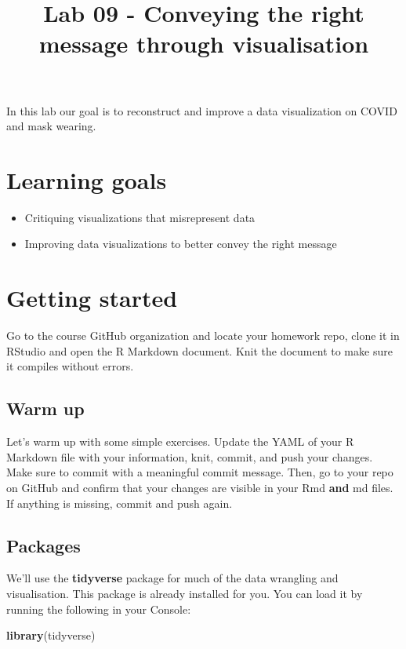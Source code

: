 \documentclass[
]{article}
\title{Lab 09 - Conveying the right message through visualisation}
\author{}
\date{\vspace{-2.5em}}
\newenvironment{Shaded}{\begin{snugshade}}{\end{snugshade}}
\newcommand{\FunctionTok}[1]{\textcolor[rgb]{0.13,0.29,0.53}{\textbf{#1}}}
\newcommand{\NormalTok}[1]{#1}
\providecommand{\tightlist}{%
  \setlength{\itemsep}{0pt}\setlength{\parskip}{0pt}}
\begin{document}
\maketitle

{
\setcounter{tocdepth}{2}
\tableofcontents
}
In this lab our goal is to reconstruct and improve a data visualization
on COVID and mask wearing.

\section{Learning goals}\label{learning-goals}

\begin{itemize}
\tightlist
\item
  Critiquing visualizations that misrepresent data
\item
  Improving data visualizations to better convey the right message
\end{itemize}

\section{Getting started}\label{getting-started}

Go to the course GitHub organization and locate your homework repo,
clone it in RStudio and open the R Markdown document. Knit the document
to make sure it compiles without errors.

\subsection{Warm up}\label{warm-up}

Let's warm up with some simple exercises. Update the YAML of your R
Markdown file with your information, knit, commit, and push your
changes. Make sure to commit with a meaningful commit message. Then, go
to your repo on GitHub and confirm that your changes are visible in your
Rmd \textbf{and} md files. If anything is missing, commit and push
again.

\subsection{Packages}\label{packages}

We'll use the \textbf{tidyverse} package for much of the data wrangling
and visualisation. This package is already installed for you. You can
load it by running the following in your Console:

\begin{Shaded}
\begin{Highlighting}[]
\FunctionTok{library}\NormalTok{(tidyverse)}
\end{Highlighting}
\end{Shaded}
\end{document}
